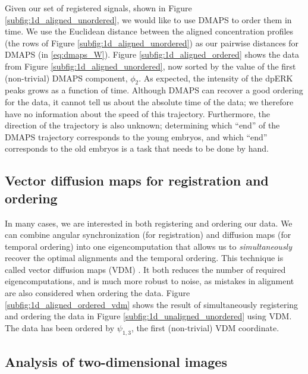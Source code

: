 \documentclass{pnastwo}
\begin{document}
\begin{article}
Given our set of registered signals, shown in Figure \ref{subfig:1d_aligned_unordered}, we would like to use DMAPS to order them in time.
%
We use the Euclidean distance between the aligned concentration profiles (the rows of Figure \ref{subfig:1d_aligned_unordered}) as our pairwise distances for DMAPS (in \eqref{eq:dmaps_W}).
%
Figure \ref{subfig:1d_aligned_ordered} shows the data from Figure \ref{subfig:1d_aligned_unordered}, now sorted by the value of the first (non-trivial) DMAPS component, $\phi_2$. 
%
As expected, the intensity of the dpERK peaks grows as a function of time. 
%
Although DMAPS can recover a good ordering for the data, it cannot tell us about the absolute time of the data; we therefore have no information about the speed of this trajectory.
%
Furthermore, the direction of the trajectory is also unknown; determining which ``end'' of the DMAPS trajectory corresponds to the young embryos, and which ``end'' corresponds to the old embryos is a task that needs to be done by hand.

\subsection{Vector diffusion maps for registration and ordering}

In many cases, we are interested in both registering and ordering our data.
%
%
We can combine angular synchronization (for registration) and diffusion maps (for temporal ordering) into one eigencomputation that allows us to {\em simultaneously} recover the optimal alignments and the temporal ordering.
%
This technique is called vector diffusion maps (VDM) \cite{singer2012vector}.
%
It both reduces the number of required eigencomputations, and is much more robust to noise, as mistakes in alignment are also considered when ordering the data.
%
Figure \ref{subfig:1d_aligned_ordered_vdm} shows the result of simultaneously registering and ordering the data in Figure \ref{subfig:1d_unaligned_unordered} using VDM. 
%
The data has been ordered by $\psi_{1, 3}$, the first (non-trivial) VDM coordinate. 

\subsection{Analysis of two-dimensional images}


\end{article}
\end{document}
